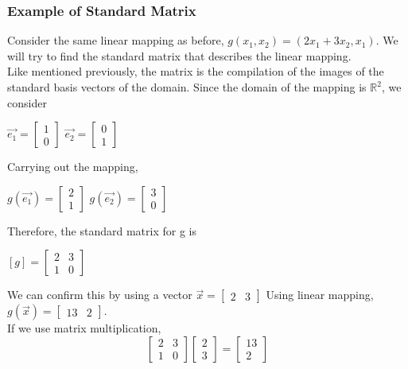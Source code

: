 \documentclass[12pt]{article}
\newcommand{\R}{\mathbb{R}}
\begin{document}
\subsubsection{Example of Standard Matrix}
Consider the same linear mapping as before, $g(x_1,x_2) = (2x_1+3x_2 , x_1)$. We will try to find the standard matrix that describes the linear mapping.\\
Like mentioned previously, the matrix is the compilation of the images of the standard basis vectors of the domain. Since the domain of the mapping is $\R^2$, we consider\\
\begin{center}
$\vec{e_1} = \begin{bmatrix}1\\0\end{bmatrix}$
$\vec{e_2} = \begin{bmatrix}0\\1\end{bmatrix}$
\end{center}
Carrying out the mapping,
\begin{center}
$g(\vec{e_1}) = \begin{bmatrix}2\\1\end{bmatrix}$
$g(\vec{e_2}) = \begin{bmatrix}3\\0\end{bmatrix}$
\end{center}
Therefore, the standard matrix for g is 

\begin{center}
$[g] = \begin{bmatrix}2 & 3\\1 & 0\end{bmatrix}$
\end{center}
We can confirm this by using a vector $\vec{x} = \begin{bmatrix}2 & 3\end{bmatrix} $
Using linear mapping, $g(\vec{x}) = \begin{bmatrix}13 & 2\end{bmatrix}$.\\
If we use matrix multiplication,
\begin{equation}
\begin{bmatrix}2 & 3\\1 & 0\end{bmatrix}\begin{bmatrix}2 \\ 3\end{bmatrix}=  \begin{bmatrix}13 \\ 2\end{bmatrix}
\end{equation}
\end{document}
